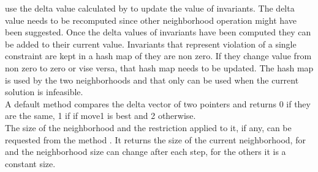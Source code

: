  use the delta value calculated by  to update the value of 
invariants. The delta value needs to be recomputed since other neighborhood operation might have been suggested. Once 
the delta values of invariants have been computed they can be added to their current value. Invariants that represent 
violation of a single constraint are kept in a hash map of they are non zero. If they change value from non zero to zero 
or vise versa, that hash map needs to be updated. The hash map is used by the two neighborhoods  
and  that only can be used when the current solution is infeasible. \\
A default method  compares the delta vector of two  pointers and returns 
0 if they are the same, 1 if if move1 is best and 2 otherwise. \\ 
The size of the neighborhood and the restriction applied to it, if any, can be requested from the 
method . It returns the size of the current neighborhood, for  and 
 the neighborhood size can change after each step, for the others it is a constant size. \\ 




